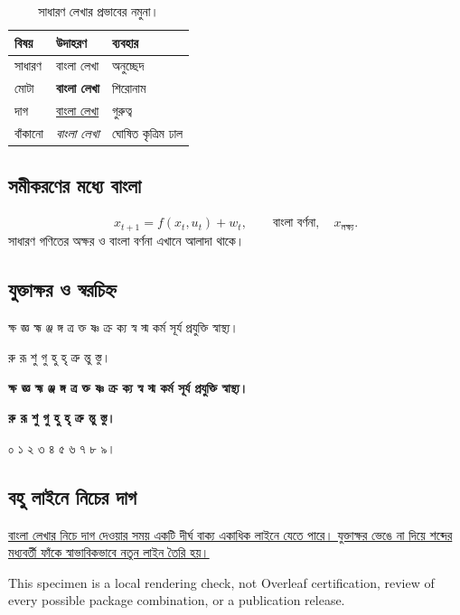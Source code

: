 \documentclass[12pt]{article}
\begin{document}
\begin{table}[h]
\centering
\begin{tabular}{lll}
\toprule
\textbf{বিষয়} & \textbf{উদাহরণ} & \textbf{ব্যবহার} \\
\midrule
সাধারণ & বাংলা লেখা & অনুচ্ছেদ \\
মোটা & \textbf{বাংলা লেখা} & শিরোনাম \\
দাগ & \underline{বাংলা লেখা} & গুরুত্ব \\
বাঁকানো & \textit{বাংলা লেখা} & ঘোষিত কৃত্রিম ঢাল \\
\bottomrule
\end{tabular}
\caption{সাধারণ লেখার প্রভাবের নমুনা।}
\end{table}

\subsection{সমীকরণের মধ্যে বাংলা}
\[
 x_{t+1}=f(x_t,u_t)+w_t,
 \qquad \text{বাংলা বর্ণনা},\quad x_{\text{লক্ষ্য}}.
\]
সাধারণ গণিতের অক্ষর ও বাংলা বর্ণনা এখানে আলাদা থাকে।

\subsection{যুক্তাক্ষর ও স্বরচিহ্ন}
ক্ষ জ্ঞ হ্ম ঞ্জ ঙ্গ ত্র ক্ত ষ্ণ ক্র ক্য স্ব স্ম কর্ম সূর্য প্রযুক্তি স্বাস্থ্য।\par
রু রূ শু গু হু হৃ ত্রু ন্তু স্তু।\par
\textbf{ক্ষ জ্ঞ হ্ম ঞ্জ ঙ্গ ত্র ক্ত ষ্ণ ক্র ক্য স্ব স্ম কর্ম সূর্য প্রযুক্তি স্বাস্থ্য।}\par
\textbf{রু রূ শু গু হু হৃ ত্রু ন্তু স্তু।}\par
০ ১ ২ ৩ ৪ ৫ ৬ ৭ ৮ ৯।

\subsection{বহু লাইনে নিচের দাগ}
\uline{বাংলা লেখার নিচে দাগ দেওয়ার সময় একটি দীর্ঘ বাক্য একাধিক লাইনে যেতে পারে। যুক্তাক্ষর ভেঙে না দিয়ে শব্দের মধ্যবর্তী ফাঁকে স্বাভাবিকভাবে নতুন লাইন তৈরি হয়।}

{\small This specimen is a local rendering check, not Overleaf certification,
review of every possible package combination, or a publication release.}
\end{document}
